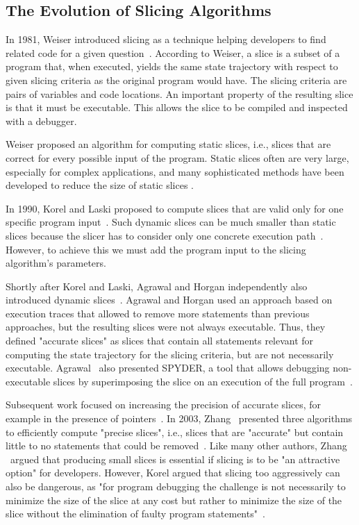 \subsection{The Evolution of Slicing Algorithms}

In 1981, Weiser introduced slicing as a technique helping developers to find related code for a given question~\cite{weiser_81_program_slicing}.
According to Weiser, a slice is a subset of a program that, when executed, yields the same state trajectory with respect to given slicing criteria as the original program would have.
The slicing criteria are pairs of variables and code locations.
An important property of the resulting slice is that it must be executable.
This allows the slice to be compiled and inspected with a debugger.

Weiser proposed an algorithm for computing static slices, i.e., slices that are correct for every possible input of the program.
Static slices often are very large, especially for complex applications, and many sophisticated methods have been developed to reduce the size of static slices .

In 1990, Korel and Laski proposed to compute slices that are valid only for one specific program input~\cite{korel_88_dynamic_program_slicing}.
Such dynamic slices can be much smaller than static slices because the slicer has to consider only one concrete execution path~\cite{venkatesh_95_experimental_results_from_dynamica, hoffner_95_evaluation_and_comparison}.
However, to achieve this we must add the program input to the slicing algorithm's parameters.

Shortly after Korel and Laski, Agrawal and Horgan independently also introduced dynamic slices~\cite{agrawal_90_dynamic_program_slicing}.
Agrawal and Horgan used an approach based on execution traces that allowed to remove more statements than previous approaches, but the resulting slices were not always executable.
Thus, they defined "accurate slices" as slices that contain all statements relevant for computing the state trajectory for the slicing criteria, but are not necessarily executable.
Agrawal \etal\ also presented SPYDER, a tool that allows debugging non-executable slices by superimposing the slice on an execution of the full program~\cite{agrawal_93_debugging_with_dynamic_slicing}.

Subsequent work focused on increasing the precision of accurate slices, for example in the presence of pointers~\cite{atkinson_02_program_slicing_using_dynamic}.
In 2003, Zhang \etal\ presented three algorithms to efficiently compute "precise slices", i.e., slices that are "accurate" but contain little to no statements that could be removed~\cite{zhang_03_precise_dynamic_slicing_algorithms}.
Like many other authors, Zhang \etal\ argued that producing small slices is essential if slicing is to be "an attractive option" for developers.
However, Korel argued that slicing too aggressively can also be dangerous, as
"for program debugging the challenge is not necessarily to minimize the size of the slice at any cost but rather to minimize the size of the slice without the elimination of faulty program statements"~\cite{korel_98_dynamic_program_slicing_methods}.

